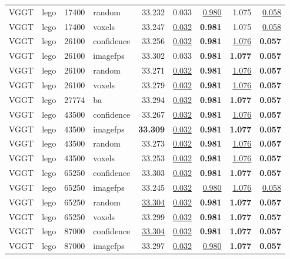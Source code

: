 \begin{table}[H]
\begin{tabular}{llrlrrrrr}
VGGT & lego & 17400 & random & 33.232 & 0.033 & \underline{0.980} & 1.075 & \underline{0.058} \\
VGGT & lego & 17400 & voxels & 33.247 & \underline{0.032} & \textbf{0.981} & 1.075 & \underline{0.058} \\
VGGT & lego & 26100 & confidence & 33.256 & \underline{0.032} & \textbf{0.981} & \underline{1.076} & \textbf{0.057} \\
VGGT & lego & 26100 & imagefps & 33.302 & 0.033 & \textbf{0.981} & \textbf{1.077} & \textbf{0.057} \\
VGGT & lego & 26100 & random & 33.271 & \underline{0.032} & \textbf{0.981} & \underline{1.076} & \textbf{0.057} \\
VGGT & lego & 26100 & voxels & 33.279 & \underline{0.032} & \textbf{0.981} & \underline{1.076} & \textbf{0.057} \\
VGGT & lego & 27774 & ba & 33.294 & \underline{0.032} & \textbf{0.981} & \textbf{1.077} & \textbf{0.057} \\
VGGT & lego & 43500 & confidence & 33.267 & \underline{0.032} & \textbf{0.981} & \underline{1.076} & \textbf{0.057} \\
VGGT & lego & 43500 & imagefps & \textbf{33.309} & \underline{0.032} & \textbf{0.981} & \textbf{1.077} & \textbf{0.057} \\
VGGT & lego & 43500 & random & 33.273 & \underline{0.032} & \textbf{0.981} & \underline{1.076} & \textbf{0.057} \\
VGGT & lego & 43500 & voxels & 33.253 & \underline{0.032} & \textbf{0.981} & \underline{1.076} & \textbf{0.057} \\
VGGT & lego & 65250 & confidence & 33.303 & \underline{0.032} & \textbf{0.981} & \textbf{1.077} & \textbf{0.057} \\
VGGT & lego & 65250 & imagefps & 33.245 & \underline{0.032} & \underline{0.980} & \underline{1.076} & \underline{0.058} \\
VGGT & lego & 65250 & random & \underline{33.304} & \underline{0.032} & \textbf{0.981} & \textbf{1.077} & \textbf{0.057} \\
VGGT & lego & 65250 & voxels & 33.299 & \underline{0.032} & \textbf{0.981} & \textbf{1.077} & \textbf{0.057} \\
VGGT & lego & 87000 & confidence & \underline{33.304} & \underline{0.032} & \textbf{0.981} & \textbf{1.077} & \textbf{0.057} \\
VGGT & lego & 87000 & imagefps & 33.297 & \underline{0.032} & \underline{0.980} & \textbf{1.077} & \textbf{0.057} \\

\end{tabular}
\end{table}
